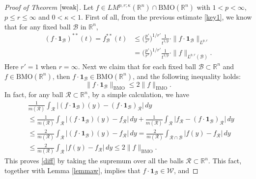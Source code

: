 \documentclass{birkjour}
\theoremstyle{definition}
\theoremstyle{remark}
\numberwithin{equation}{section}
\begin{document}
\begin{proof}[Proof of Theorem $\ref{weak}$]
Let $f\in LM^{p,r;\kappa}(\mathbb R^n)\cap \mathrm{BMO}(\mathbb R^n)$ with $1<p<\infty$, $p\leq r\leq\infty$ and $0<\kappa<1$. First of all, from the previous estimate \eqref{key1}, we know that for any fixed ball $\mathcal{B}$ in $\mathbb R^n$,
\begin{equation}\label{key3}
\begin{split}
(f\cdot\mathbf{1}_{\mathcal{B}})^{**}(t)=f^{**}_{\mathcal{B}}(t)
&\leq\Big(\frac{p'}{r'}\Big)^{1/{r'}}\frac{1}{t^{1/p}}\cdot\|f\cdot\mathbf{1}_{\mathcal{B}}\|_{L^{p,r}}\\
&=\Big(\frac{p'}{r'}\Big)^{1/{r'}}\frac{1}{t^{1/p}}\cdot\|f\|_{L^{p,r}(\mathcal{B})}.
\end{split}
\end{equation}
Here $r'=1$ when $r=\infty$. Next we claim that for each fixed ball $\mathcal{B}\subset\mathbb R^n$ and $f\in\mathrm{BMO}(\mathbb R^n)$, then $f\cdot\mathbf{1}_{\mathcal{B}}\in \mathrm{BMO}(\mathbb R^n)$, and the following inequality holds:
\begin{equation}\label{diff}
\|f\cdot\mathbf{1}_{\mathcal{B}}\|_{\mathrm{BMO}}\leq 2\|f\|_{\mathrm{BMO}}.
\end{equation}
In fact, for any ball $\mathcal{R}\subset\mathbb R^n$, by a simple calculation, we have
\begin{equation*}
\begin{split}
&\frac{1}{m(\mathcal{R})}\int_{\mathcal{R}}\big|(f\cdot\mathbf{1}_{\mathcal{B}})(y)-(f\cdot\mathbf{1}_{\mathcal{B}})_{\mathcal{R}}\big|\,dy\\
&\leq\frac{1}{m(\mathcal{R})}\int_{\mathcal{R}}\big|(f\cdot\mathbf{1}_{\mathcal{B}})(y)-f_{\mathcal{R}}\big|\,dy
+\frac{1}{m(\mathcal{R})}\int_{\mathcal{R}}\big|f_{\mathcal{R}}-(f\cdot\mathbf{1}_{\mathcal{B}})_{\mathcal{R}}\big|\,dy\\
&\leq \frac{2}{m(\mathcal{R})}\int_{\mathcal{R}}\big|(f\cdot\mathbf{1}_{\mathcal{B}})(y)-f_{\mathcal{R}}\big|\,dy
=\frac{2}{m(\mathcal{R})}\int_{\mathcal{R}\cap \mathcal{B}}\big|f(y)-f_{\mathcal{R}}\big|\,dy\\
&\leq\frac{2}{m(\mathcal{R})}\int_{\mathcal{R}}\big|f(y)-f_{\mathcal{R}}\big|\,dy\leq 2\|f\|_{\mathrm{BMO}}.
\end{split}
\end{equation*}
This proves \eqref{diff} by taking the supremum over all the balls $\mathcal{R}\subset\mathbb R^n$. This fact, together with Lemma \ref{lemmaw}, implies that $f\cdot\mathbf{1}_{\mathcal{B}}\in \mathcal{W}$, and

\end{proof}
\end{document}
